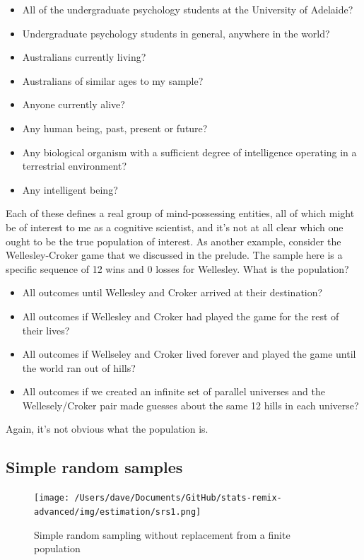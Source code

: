 \documentclass[
]{book}
\providecommand{\tightlist}{%
  \setlength{\itemsep}{0pt}\setlength{\parskip}{0pt}}
\begin{document}
\begin{itemize}
\tightlist
\item
  All of the undergraduate psychology students at the University of Adelaide?
\item
  Undergraduate psychology students in general, anywhere in the world?
\item
  Australians currently living?
\item
  Australians of similar ages to my sample?
\item
  Anyone currently alive?
\item
  Any human being, past, present or future?
\item
  Any biological organism with a sufficient degree of intelligence operating in a terrestrial environment?
\item
  Any intelligent being?
\end{itemize}

Each of these defines a real group of mind-possessing entities, all of which might be of interest to me as a cognitive scientist, and it's not at all clear which one ought to be the true population of interest. As another example, consider the Wellesley-Croker game that we discussed in the prelude. The sample here is a specific sequence of 12 wins and 0 losses for Wellesley. What is the population?

\begin{itemize}
\tightlist
\item
  All outcomes until Wellesley and Croker arrived at their destination?
\item
  All outcomes if Wellesley and Croker had played the game for the rest of their lives?
\item
  All outcomes if Wellseley and Croker lived forever and played the game until the world ran out of hills?
\item
  All outcomes if we created an infinite set of parallel universes and the Wellesely/Croker pair made guesses about the same 12 hills in each universe?
\end{itemize}

Again, it's not obvious what the population is.

\hypertarget{simple-random-samples}{%
\subsection{Simple random samples}\label{simple-random-samples}}

\begin{figure}
\centering
\texttt{[image: /Users/dave/Documents/GitHub/stats-remix-advanced/img/estimation/srs1.png]}
\caption{\label{fig:srs1}Simple random sampling without replacement from a finite population}
\end{figure}
\end{document}
